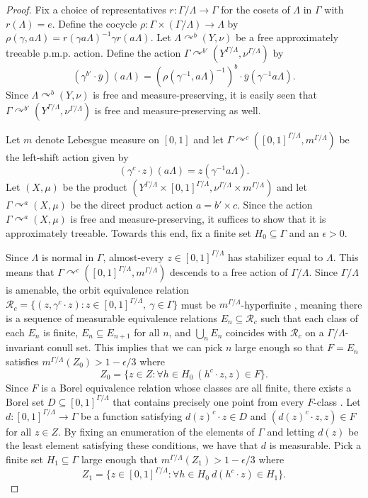 \documentclass[12pt]{amsart}
\theoremstyle{definition}
\def\cal{\mathcal}
\newcommand{\pmp}{p{$.$}m{$.$}p{$.$}}
\newcommand{\acts}{\curvearrowright}
\begin{document}
\begin{proof}
    Fix a choice of representatives $r : \Gamma / \Lambda \rightarrow \Gamma$ for the cosets of $\Lambda$ in $\Gamma$ with $r(\Lambda) = e$. Define the cocycle $\rho : \Gamma \times (\Gamma / \Lambda) \rightarrow \Lambda$ by $\rho(\gamma, a \Lambda) = r(\gamma a \Lambda)^{-1} \gamma r(a \Lambda)$. Let $\Lambda \acts^b (Y, \nu)$ be a free approximately treeable {\pmp} action. Define the action $\Gamma \acts^{b'} (Y^{\Gamma / \Lambda}, \nu^{\Gamma / \Lambda})$ by
    \[(\gamma^{b'} \cdot \bar y)(a \Lambda) = (\rho(\gamma^{-1}, a \Lambda)^{-1})^b \cdot \bar y(\gamma^{-1} a \Lambda).\]
    Since $\Lambda \acts^b (Y, \nu)$ is free and measure-preserving, it is easily seen that $\Gamma \acts^{b'} (Y^{\Gamma / \Lambda}, \nu^{\Gamma / \Lambda})$ is free and measure-preserving as well.

    Let $m$ denote Lebesgue measure on $[0,1]$ and let $\Gamma \acts^c ([0,1]^{\Gamma / \Lambda}, m^{\Gamma / \Lambda})$ be the left-shift action given by
    \[(\gamma^c \cdot z)(a \Lambda) = z(\gamma^{-1} a \Lambda).\]
    Let $(X, \mu)$ be the product $(Y^{\Gamma / \Lambda} \times [0,1]^{\Gamma / \Lambda}, \nu^{\Gamma / \Lambda} \times m^{\Gamma / \Lambda})$ and let $\Gamma \acts^a (X, \mu)$ be the direct product action $a = b' \times c$. Since the action $\Gamma \acts^a (X, \mu)$ is free and measure-preserving, it suffices to show that it is approximately treeable. Towards this end, fix a finite set $H_0 \subseteq \Gamma$ and an $\epsilon > 0$.

    Since $\Lambda$ is normal in $\Gamma$, almost-every $z \in [0,1]^{\Gamma / \Lambda}$ has stabilizer equal to $\Lambda$. This means that $\Gamma \acts^c ([0,1]^{\Gamma / \Lambda}, m^{\Gamma / \Lambda})$ descends to a free action of $\Gamma / \Lambda$. Since $\Gamma / \Lambda$ is amenable, the orbit equivalence relation $\cal R_c = \{(z, \gamma^c \cdot z) : z \in [0,1]^{\Gamma / \Lambda}, \ \gamma \in \Gamma\}$ must be $m^{\Gamma / \Lambda}$-hyperfinite \cite{OW80}, meaning there is a sequence of measurable equivalence relations $E_n \subseteq \cal R_c$ such that each class of each $E_n$ is finite, $E_n \subseteq E_{n+1}$ for all $n$, and $\bigcup_n E_n$ coincides with $\cal R_c$ on a $\Gamma / \Lambda$-invariant conull set. This implies that we can pick $n$ large enough so that $F = E_n$ satisfies $m^{\Gamma / \Lambda}(Z_0) > 1 - \epsilon/3$ where
    \[Z_0 = \{z \in Z : \forall h \in H_0 \ (h^c \cdot z, z) \in F\}.\]
    Since $F$ is a Borel equivalence relation whose classes are all finite, there exists a Borel set $D \subseteq [0,1]^{\Gamma / \Lambda}$ that contains precisely one point from every $F$-class \cite[Theorem 12.16]{K95}. Let $d : [0,1]^{\Gamma / \Lambda} \rightarrow \Gamma$ be a function satisfying $d(z)^c \cdot z \in D$ and $(d(z)^c \cdot z, z) \in F$ for all $z \in Z$. By fixing an enumeration of the elements of $\Gamma$ and letting $d(z)$ be the least element satisfying these conditions, we have that $d$ is measurable. Pick a finite set $H_1 \subseteq \Gamma$ large enough that $m^{\Gamma / \Lambda}(Z_1) > 1 - \epsilon/3$ where
    \[Z_1 = \{z \in [0,1]^{\Gamma / \Lambda} : \forall h \in H_0 \ d(h^c \cdot z) \in H_1\}.\]


\end{proof}
\end{document}

